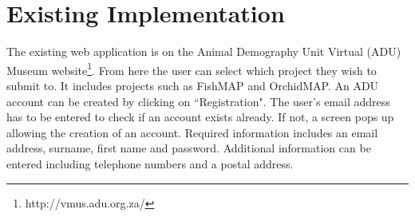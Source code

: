 \documentclass[12pt,a4paper,oneside]{report}
\begin{document}
\section{Existing Implementation}
  \begin{spacing}{1.4}
    The existing web application is on the Animal Demography Unit Virtual (ADU) Museum website\footnote{http://vmus.adu.org.za/}.  From here the user can select which project they wish to submit to. It includes projects such as FishMAP and OrchidMAP.  An ADU account can be created by clicking on ``Registration".  The user's email address has to be entered to check if an account exists
    already.  If not, a screen pops up allowing the creation of an account.  Required information includes an email address, surname, first name and password.  Additional information can be entered including telephone numbers and a postal address.


\end{spacing}
\end{document}

